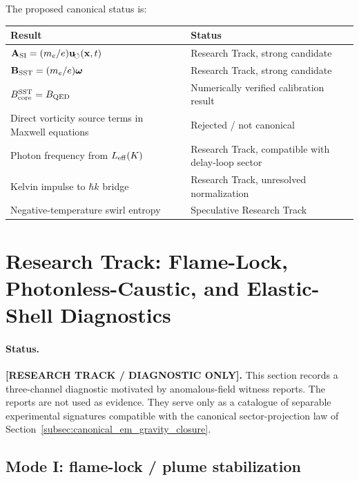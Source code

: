 The proposed canonical status is:

\begin{center}
    \begin{tabular}{ll}
        \hline
        Result & Status \\
        \hline
        \(\mathbf{A}_{\rm SI}=(m_e/e)\mathbf{u}_{\!\boldsymbol{\circlearrowleft}}(\mathbf{x},t)\) & Research Track, strong candidate \\
        \(\mathbf{B}_{\rm SST}=(m_e/e)\boldsymbol{\omega}\) & Research Track, strong candidate \\
        \(B_{\rm core}^{\rm SST}=B_{\rm QED}\) & Numerically verified calibration result \\
        Direct vorticity source terms in Maxwell equations & Rejected / not canonical \\
        Photon frequency from \(L_{\rm eff}(K)\) & Research Track, compatible with delay-loop sector \\
        Kelvin impulse to \(\hbar k\) bridge & Research Track, unresolved normalization \\
        Negative-temperature swirl entropy & Speculative Research Track \\
        \hline
    \end{tabular}
\end{center}

\section{Research Track: Flame-Lock, Photonless-Caustic, and Elastic-Shell Diagnostics}
\label{sec:rt_flame_photonless_shell}

\paragraph{Status.}
\textbf{[RESEARCH TRACK / DIAGNOSTIC ONLY].}
This section records a three-channel diagnostic motivated by anomalous-field
witness reports. The reports are not used as evidence. They serve only as a
catalogue of separable experimental signatures compatible with the canonical
sector-projection law of Section~\ref{subsec:canonical_em_gravity_closure}.

\subsection{Mode I: flame-lock / plume stabilization}

